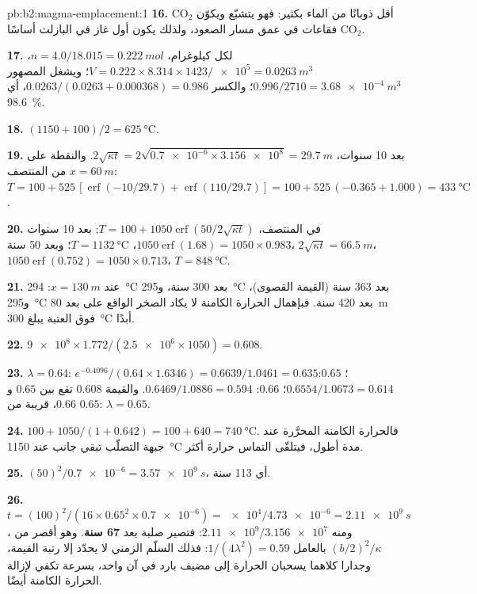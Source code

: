 \begin{solution}{pb:b2:magma-emplacement:1}
\textbf{16.} CO$_2$ أقل ذوبانًا من الماء بكثير: فهو يتشبّع ويكوّن فقاعات
في عمق مسار الصعود، ولذلك يكون أول غاز في البازلت أساسًا CO$_2$.

\textbf{17.} لكل كيلوغرام، $n = 4.0/18.015 = \qty{0.222}{mol}$، $V = 0.222\times8.314\times1423/
\num{e5} = \qty{0.0263}{m^3}$؛ ويشغل المصهور $0.996/2710 = \qty{3.68e-4}{m^3}$؛
والكسر $0.0263/(0.0263 + 0.000368) = 0.986$، أي \qty{98.6}{\percent}.

\textbf{18.} $(1150 + 100)/2 = \qty{625}{\celsius}$.

\textbf{19.} بعد 10 سنوات، $2\sqrt{\kappa t} = 2\sqrt{\num{0.7e-6}\times\num{3.156e8}} =
\qty{29.7}{m}$. والنقطة على $x = \qty{60}{m}$ من المنتصف: $T = 100 +
525\,[\operatorname{erf}(-10/29.7) + \operatorname{erf}(110/29.7)] = 100 + 525\,(-0.365 +
1.000) = \qty{433}{\celsius}$.

\textbf{20.} في المنتصف، $T = 100 + 1050\operatorname{erf}(50/2\sqrt{\kappa t})$: بعد
10 سنوات $1050\operatorname{erf}(1.68) = 1050\times0.983$، $T = \qty{1132}{\celsius}$؛ وبعد
50 سنة، $2\sqrt{\kappa t} = \qty{66.5}{m}$، $1050\operatorname{erf}(0.752) = 1050\times0.713$،
$T = \qty{848}{\celsius}$.

\textbf{21.} عند $x = \qty{130}{m}$: \qty{294}{\celsius} بعد 300 سنة،
و\qty{295}{\celsius} بعد 363 سنة (القيمة القصوى)، و\qty{295}{\celsius} بعد 420
سنة. فبإهمال الحرارة الكامنة لا يكاد الصخر الواقع على بعد \qty{80}{m} فوق العتبة
يبلغ \qty{300}{\celsius} أبدًا.

\textbf{22.} $\num{9e8}\times1.772/(\num{2.5e6}\times1050) = 0.608$.

\textbf{23.} $\lambda = 0.64$: $e^{-0.4096}/(0.64\times1.6346) = 0.6639/1.0461 = 0.635$؛
$0.65$: $0.6554/1.0673 = 0.614$؛ $0.66$: $0.6469/1.0886 = 0.594$. والقيمة $0.608$
تقع بين $0.65$ و$0.66$، قريبة من $0.65$: $\lambda = 0.65$.

\textbf{24.} $100 + 1050/(1 + 0.642) = 100 + 640 = \qty{740}{\celsius}$. فالحرارة
الكامنة المحرَّرة عند جبهة التصلّب تبقي جانب  عند
\qty{1150}{\celsius} مدة أطول، فيتلقّى التماس حرارة أكثر.

\textbf{25.} $(50)^2/\num{0.7e-6} = \qty{3.57e9}{s}$، أي 113 سنة.

\textbf{26.} $t = (100)^2/(16\times0.65^2\times\num{0.7e-6}) = \num{e4}/\num{4.73e-6} =
\qty{2.11e9}{s}$، ومنه $\num{2.11e9}/\num{3.156e7}$: فتصير  صلبة بعد
\textbf{\qty[text-series-to-math=true]{67}{} سنة}. وهو أقصر من
$(b/2)^2/\kappa$ بالعامل $1/(4\lambda^2) = 0.59$: فذلك السلّم الزمني لا يحدّد إلا
رتبة القيمة، وجدارا  كلاهما يسحبان الحرارة إلى مضيف بارد في
آن واحد، بسرعة تكفي لإزالة الحرارة الكامنة أيضًا.
\end{solution}
